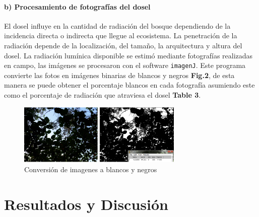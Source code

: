 \documentclass[letterpaper,9pt,onecolumn,twoside,]{pinp}
\begin{document}
\hypertarget{b-procesamiento-de-fotografuxedas-del-dosel}{%
\paragraph{b) Procesamiento de fotografías del
dosel}\label{b-procesamiento-de-fotografuxedas-del-dosel}}

El dosel influye en la cantidad de radiación del bosque dependiendo de
la incidencia directa o indirecta que llegue al ecosistema.
La penetración de la radiación depende de la localización, del tamaño,
la arquitectura y altura del dosel. La radiación lumínica disponible se
estimó mediante fotografías realizadas en campo, las imágenes se
procesaron con el software \texttt{imagenJ}. Este programa convierte las
fotos en imágenes binarias de blancos y negros \textbf{Fig.2}, de esta manera
se puede obtener el porcentaje blancos en cada fotografía asumiendo
este como el porcentaje de radiación que atraviesa el dosel \textbf{Table 3}.

\begin{figure}[h]
  \centering
  \includegraphics[width= 0.7\textwidth]{ima2.png}
  \caption{Conversión de imagenes a blancos y negros}
\end{figure}

\hypertarget{resultados-y-discusiuxf3n}{%
\section{Resultados y Discusión}\label{resultados-y-discusiuxf3n}}
\end{document}
